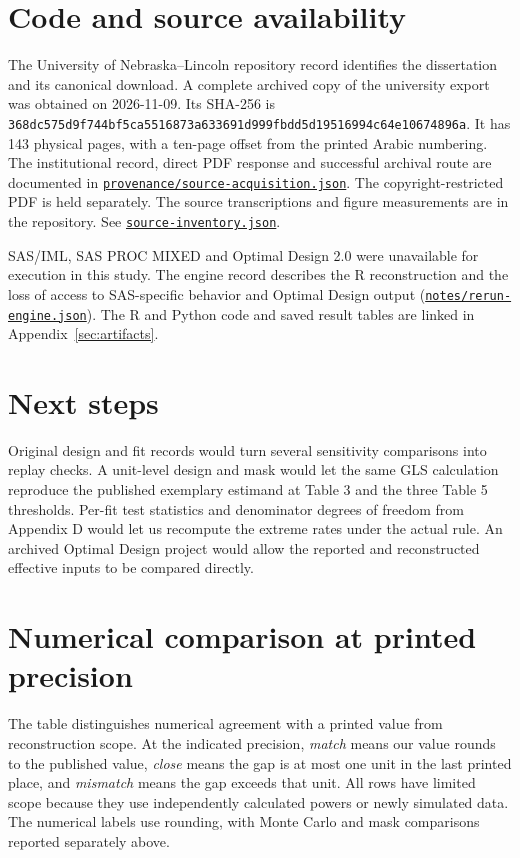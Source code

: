 \section{Code and source availability}\label{sec:availability}
The University of Nebraska--Lincoln repository record identifies the dissertation and its canonical download. A complete archived copy of the university export was obtained on 2026-11-09. Its SHA-256 is \nolinkurl{368dc575d9f744bf5ca5516873a633691d999fbdd5d19516994c64e10674896a}. It has 143 physical pages, with a ten-page offset from the printed Arabic numbering. The institutional record, direct PDF response and successful archival route are documented in \href{https://github.com/alectionary/vibe-math/blob/master/formalization/kupzyk-power-assumptions/provenance/source-acquisition.json}{\nolinkurl{provenance/source-acquisition.json}}. The copyright-restricted PDF is held separately. The source transcriptions and figure measurements are in the repository. See \href{https://github.com/alectionary/vibe-math/blob/master/formalization/kupzyk-power-assumptions/source-inventory.json}{\nolinkurl{source-inventory.json}}.

SAS/IML, SAS PROC MIXED and Optimal Design 2.0 were unavailable for execution in this study. The engine record describes the R reconstruction and the loss of access to SAS-specific behavior and Optimal Design output (\href{https://github.com/alectionary/vibe-math/blob/master/formalization/kupzyk-power-assumptions/notes/rerun-engine.json}{\nolinkurl{notes/rerun-engine.json}}). The R and Python code and saved result tables are linked in Appendix~\ref{sec:artifacts}.

\section{Next steps}\label{sec:next}
Original design and fit records would turn several sensitivity comparisons into replay checks. A unit-level design and mask would let the same GLS calculation reproduce the published exemplary estimand at Table 3 and the three Table 5 thresholds. Per-fit test statistics and denominator degrees of freedom from Appendix D would let us recompute the extreme rates under the actual rule. An archived Optimal Design project would allow the reported and reconstructed effective inputs to be compared directly.

\section{Numerical comparison at printed precision}\label{sec:numbers}
The table distinguishes numerical agreement with a printed value from reconstruction scope. At the indicated precision, \emph{match} means our value rounds to the published value, \emph{close} means the gap is at most one unit in the last printed place, and \emph{mismatch} means the gap exceeds that unit. All rows have limited scope because they use independently calculated powers or newly simulated data. The numerical labels use rounding, with Monte Carlo and mask comparisons reported separately above.

